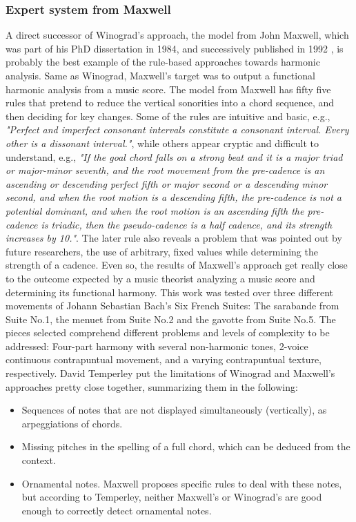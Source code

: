     \subsubsection{Expert system from Maxwell}
    A direct successor of Winograd's approach, the model from John Maxwell, which was part of his PhD dissertation in 1984, and successively published in 1992 \cite{maxwell1992expert}, is probably the best example of the rule-based approaches towards harmonic analysis. Same as Winograd, Maxwell's target was to output a functional harmonic analysis from a music score. The model from Maxwell has fifty five rules that pretend to reduce the vertical sonorities into a chord sequence, and then deciding for key changes. Some of the rules are intuitive and basic, e.g., \emph{"Perfect and imperfect consonant intervals constitute a consonant interval. Every other is a dissonant interval."}, while others appear cryptic and difficult to understand, e.g., \emph{"If the goal chord falls on a strong beat and it is a major triad or major-minor seventh, and the root movement from the pre-cadence is an ascending or descending perfect fifth or major second or a descending minor second, and when the root motion is a descending fifth, the pre-cadence is not a potential dominant, and when the root motion is an ascending fifth the pre-cadence is triadic, then the pseudo-cadence is a half cadence, and its strength increases by 10."}.
    The later rule also reveals a problem that was pointed out by future researchers, the use of arbitrary, fixed values while determining the strength of a cadence. Even so, the results of Maxwell's approach get really close to the outcome expected by a music theorist analyzing a music score and determining its functional harmony. This work was tested over three different movements of Johann Sebastian Bach's Six French Suites: The sarabande from Suite No.1, the menuet from Suite No.2 and the gavotte from Suite No.5. The pieces selected comprehend different problems and levels of complexity to be addressed: Four-part harmony with several non-harmonic tones, 2-voice continuous contrapuntual movement, and a varying contrapuntual texture, respectively. David Temperley put the limitations of Winograd and Maxwell's approaches pretty close together, summarizing them in the following:
		\begin{itemize}
			\item Sequences of notes that are not displayed simultaneously (vertically), as arpeggiations of chords.
			\item Missing pitches in the spelling of a full chord, which can be deduced from the context.
			\item Ornamental notes. Maxwell proposes specific rules to deal with these notes, but according to Temperley, neither Maxwell’s or Winograd’s are good enough to correctly detect ornamental notes.
    \end{itemize}

